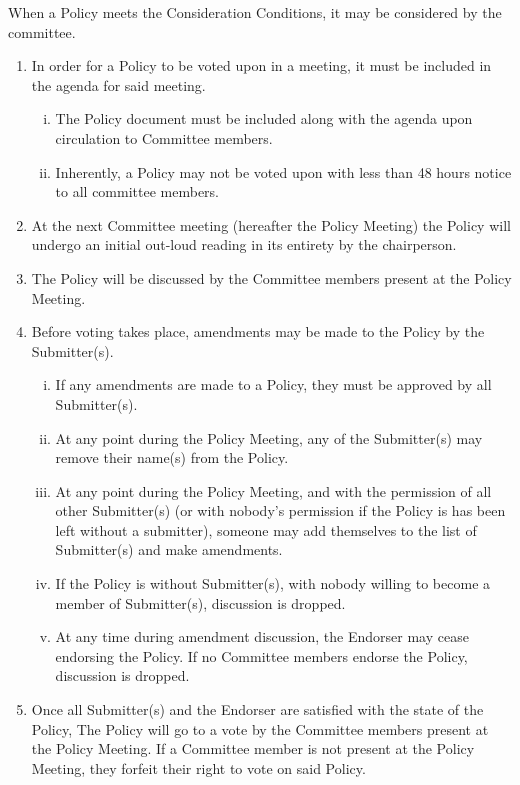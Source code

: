 \documentclass[a4paper,12pt]{article}
\begin{document}
When a Policy meets the Consideration Conditions, it may be considered by the committee.

\begin{enumerate}[1)]
    \item In order for a Policy to be voted upon in a meeting, it must be included in the agenda for said meeting.
    \begin{enumerate}[i)]
        \item The Policy document must be included along with the agenda upon circulation to Committee members.
        \item Inherently, a Policy may not be voted upon with less than 48 hours notice to all committee members.
    \end{enumerate}
    \item At the next Committee meeting (hereafter the Policy Meeting) the Policy will undergo an initial out-loud reading in its entirety by the chairperson.
    \item The Policy will be discussed by the Committee members present at the Policy Meeting.
    \item Before voting takes place, amendments may be made to the Policy by the Submitter(s).
    \begin{enumerate}[i)]
        \item If any amendments are made to a Policy, they must be approved by all Submitter(s).
        \item At any point during the Policy Meeting, any of the Submitter(s) may remove their name(s) from the Policy.
        \item At any point during the Policy Meeting, and with the permission of all other Submitter(s) (or with nobody's permission if the Policy is has been left without a submitter), someone may add themselves to the list of Submitter(s) and make amendments.
        \item If the Policy is without Submitter(s), with nobody willing to become a member of Submitter(s), discussion is dropped.
        \item At any time during amendment discussion, the Endorser may cease endorsing the Policy. If no Committee members endorse the Policy, discussion is dropped.
    \end{enumerate}
    \item Once all Submitter(s) and the Endorser are satisfied with the state of the Policy, The Policy will go to a vote by the Committee members present at the Policy Meeting. If a Committee member is not present at the Policy Meeting, they forfeit their right to vote on said Policy.

\end{enumerate}
\end{document}
